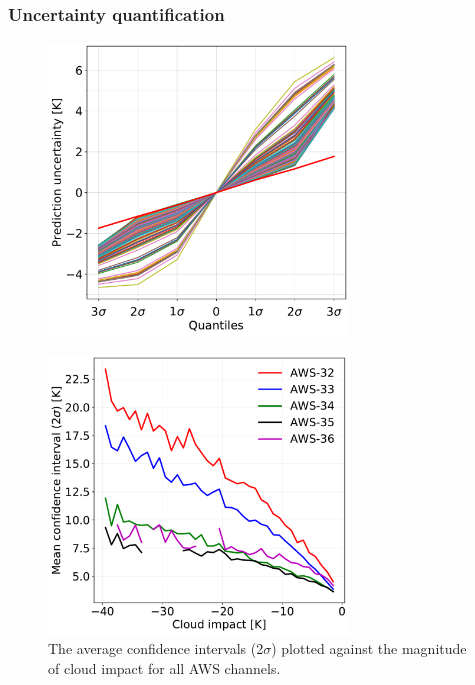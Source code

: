 \documentclass[amt, manuscript]{copernicus}
\begin{document}
\subsubsection{Uncertainty quantification}
\begin{figure}[t]
	\includegraphics[width = 80mm]{Figures/prediction_uncertainty_aws-34.pdf}	
	\caption{}
	\label{fig:prediction_uncertainty_aws-34}	
\end{figure}
\begin{figure}[t]
	\includegraphics[width = 80mm]{Figures/cloud_impact_uncertainty_AWS.pdf}	
	\caption{The average confidence intervals (2$\sigma$) plotted against the magnitude of cloud impact for all AWS channels.}
	\label{fig:uncertainty_cloud_impact}	
\end{figure}
\end{document}
